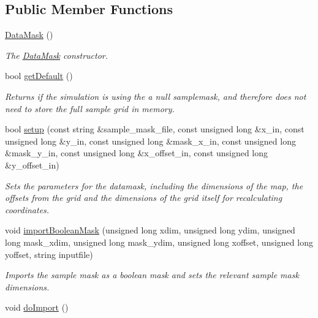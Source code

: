 \subsection*{Public Member Functions}
\begin{DoxyCompactItemize}
\item 
\hyperlink{class_data_mask_ae89a953b8200f027d44dc74fa748852b}{Data\+Mask} ()
\begin{DoxyCompactList}\small\item\em The \hyperlink{class_data_mask}{Data\+Mask} constructor. \end{DoxyCompactList}\item 
bool \hyperlink{class_data_mask_a093364b6da9442f7c4945b5a06cfe3af}{get\+Default} ()
\begin{DoxyCompactList}\small\item\em Returns if the simulation is using the a null samplemask, and therefore does not need to store the full sample grid in memory. \end{DoxyCompactList}\item 
bool \hyperlink{class_data_mask_a73922a90e7f491ec3dcf90fdd400fdf8}{setup} (const string \&sample\+\_\+mask\+\_\+file, const unsigned long \&x\+\_\+in, const unsigned long \&y\+\_\+in, const unsigned long \&mask\+\_\+x\+\_\+in, const unsigned long \&mask\+\_\+y\+\_\+in, const unsigned long \&x\+\_\+offset\+\_\+in, const unsigned long \&y\+\_\+offset\+\_\+in)
\begin{DoxyCompactList}\small\item\em Sets the parameters for the datamask, including the dimensions of the map, the offsets from the grid and the dimensions of the grid itself for recalculating coordinates. \end{DoxyCompactList}\item 
void \hyperlink{class_data_mask_a819eacf6968b0384a0221599dac09122}{import\+Boolean\+Mask} (unsigned long xdim, unsigned long ydim, unsigned long mask\+\_\+xdim, unsigned long mask\+\_\+ydim, unsigned long xoffset, unsigned long yoffset, string inputfile)
\begin{DoxyCompactList}\small\item\em Imports the sample mask as a boolean mask and sets the relevant sample mask dimensions. \end{DoxyCompactList}\item 
void \hyperlink{class_data_mask_a85f7b85bb4ac54aa884a8a06f1d35d1b}{do\+Import} ()\hypertarget{class_data_mask_a85f7b85bb4ac54aa884a8a06f1d35d1b}{}\label{class_data_mask_a85f7b85bb4ac54aa884a8a06f1d35d1b}


\end{DoxyCompactItemize}
